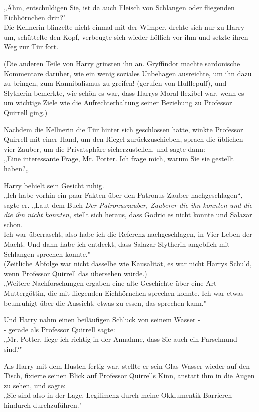 {„Ähm, entschuldigen Sie, ist da auch Fleisch von Schlangen oder fliegenden Eichhörnchen drin?"\\ Die Kellnerin blinzelte nicht einmal mit der Wimper, drehte sich nur zu Harry um, schüttelte den Kopf, verbeugte sich wieder höflich vor ihm und setzte ihren Weg zur Tür fort.

(Die anderen Teile von Harry grinsten ihn an. Gryffindor machte sardonische Kommentare darüber, wie ein wenig soziales Unbehagen ausreichte, um ihn dazu zu bringen, zum Kannibalismus zu greifen! (gerufen von Hufflepuff), und Slytherin bemerkte, wie schön es war, dass Harrys Moral flexibel war, wenn es um wichtige Ziele wie die Aufrechterhaltung seiner Beziehung zu Professor Quirrell ging.)

Nachdem die Kellnerin die Tür hinter sich geschlossen hatte, winkte Professor Quirrell mit einer Hand, um den Riegel zurückzuschieben, sprach die üblichen vier Zauber, um die Privatsphäre sicherzustellen, und sagte dann:\\ „Eine interessante Frage, Mr. Potter. Ich frage mich, warum Sie sie gestellt haben?„

Harry behielt sein Gesicht ruhig.\\ „Ich habe vorhin ein paar Fakten über den Patronus-Zauber nachgeschlagen“, sagte er. „Laut dem Buch \emph{Der Patronuszauber, Zauberer die ihn konnten und die die ihn nicht konnten}, stellt sich heraus, dass Godric es nicht konnte und Salazar schon.\\ Ich war überrascht, also habe ich die Referenz nachgeschlagen, in Vier Leben der Macht. Und dann habe ich entdeckt, dass Salazar Slytherin angeblich mit Schlangen sprechen konnte."\\ (Zeitliche Abfolge war nicht dasselbe wie Kausalität, es war nicht Harrys Schuld, wenn Professor Quirrell das übersehen würde.)\\ „Weitere Nachforschungen ergaben eine alte Geschichte über eine Art Muttergöttin, die mit fliegenden Eichhörnchen sprechen konnte. Ich war etwas beunruhigt über die Aussicht, etwas zu essen, das sprechen kann."

Und Harry nahm einen beiläufigen Schluck von seinem Wasser -\\ - gerade als Professor Quirrell sagte:\\ „Mr. Potter, liege ich richtig in der Annahme, dass Sie auch ein Parselmund sind?"

Als Harry mit dem Husten fertig war, stellte er sein Glas Wasser wieder auf den Tisch, fixierte seinen Blick auf Professor Quirrells Kinn, anstatt ihm in die Augen zu sehen, und sagte:\\ „Sie sind also in der Lage, Legilimenz durch meine Okklumentik-Barrieren hindurch durchzuführen."

}
